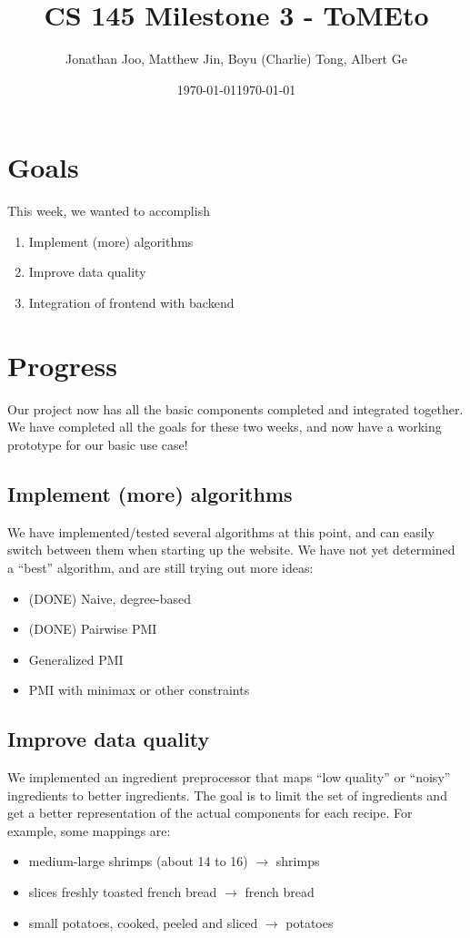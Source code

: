 \documentclass{article}
\date{\today}
\title{CS 145 Milestone 3 - ToMEto}
\author{Jonathan Joo, Matthew Jin, Boyu (Charlie) Tong, Albert Ge}
\date{\today} \\
\begin{document}
\maketitle
\section{Goals}
This week, we wanted to accomplish
\begin{enumerate}
    \item Implement (more) algorithms
    \item Improve data quality
    \item Integration of frontend with backend
\end{enumerate}



\section{Progress}
Our project now has all the basic components completed and integrated together. We have completed all the goals for these two weeks, and now have a working prototype for our basic use case!


\subsection{Implement (more) algorithms}
We have implemented/tested several algorithms at this point, and can easily switch between them when starting up the website. We have not yet determined a ``best'' algorithm, and are still trying out more ideas:
\begin{itemize}
  \item (DONE) Naive, degree-based
  \item (DONE) Pairwise PMI
  \item Generalized PMI
  \item PMI with minimax or other constraints
\end{itemize}


\subsection{Improve data quality}
We implemented an ingredient preprocessor that maps ``low quality'' or ``noisy'' ingredients to better ingredients. The goal is to limit the set of ingredients and get a better representation of the actual components for each recipe. For example, some mappings are:
\begin{itemize}
  \item medium-large shrimps (about 14 to 16) $\to$ shrimps
  \item slices freshly toasted french bread $\to$ french bread
  \item small potatoes, cooked, peeled and sliced $\to$ potatoes
\end{itemize}
\end{document}
